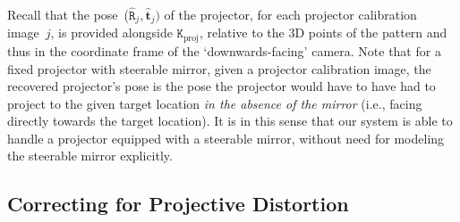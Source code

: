 \documentclass[review]{elsarticle}
\begin{document}
Recall that the pose~($\hat{\mathtt{R}}_j, \hat{\mathbf{t}}_j)$ of the projector, for each projector calibration image~$j$, is provided alongside $\mathtt{K}_\text{proj}$, relative to the 3D points of the pattern and thus in the coordinate frame of the `downwards-facing' camera. Note that for a fixed projector with steerable mirror, given a projector calibration image, the recovered projector's pose is the pose the projector would have to have had to project to the given target location \textit{in the absence of the mirror} (i.e., facing directly towards the target location). It is in this sense that our system is able to handle a projector equipped with a steerable mirror, without need for modeling the steerable mirror explicitly.

\subsection{Correcting for Projective Distortion}\label{sec:approach:homography}
\end{document}
